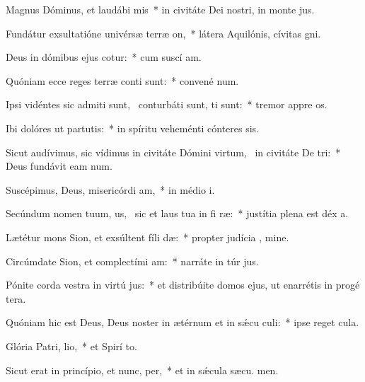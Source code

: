 \item Magnus Dóminus, et laudábi mis~* in civitáte Dei nostri, in monte  jus.
\item Fundátur exsultatióne univérsæ terræ  on,~* látera Aquilónis, cívitas  gni.
\item Deus in dómibus ejus cotur:~* cum suscí am.
\item Quóniam ecce reges terræ conti sunt:~* convené  num.
\item Ipsi vidéntes sic admiti sunt,~\pscross{} conturbáti sunt, ti sunt:~* tremor appre os.
\item Ibi dolóres ut partutis:~* in spíritu veheménti cónteres  sis.
\item Sicut audívimus, sic vídimus in civitáte Dómini virtum,~\pscross{} in civitáte De tri:~* Deus fundávit eam  num.
\item Suscépimus, Deus, misericórdi am,~* in médio  i.
\item Secúndum nomen tuum, us,~\pscross{} sic et laus tua in fi ræ:~* justítia plena est déx a.
\item Lætétur mons Sion, et exsúltent fíli dæ:~* propter judícia , mine.
\item Circúmdate Sion, et complectími am:~* narráte in túr jus.
\item Pónite corda vestra in virtú jus:~* et distribúite domos ejus, ut enarrétis in progé tera.
\item Quóniam hic est Deus, Deus noster in ætérnum et in sǽcu culi:~* ipse reget   cula.
\item Glória Patri,  lio,~* et Spirí to.
\item Sicut erat in princípio, et nunc,  per,~* et in sǽcula sæcu. men.
